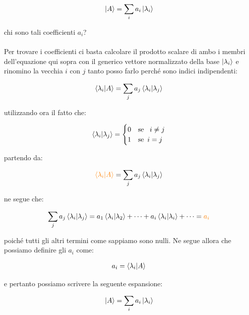 \begin{align*}
	\ket{A} = \sum_i a_i \ket{\lambda_i}
\end{align*}

	chi sono tali coefficienti $a_i$?
	\\
	\\
	Per trovare i coefficienti ci basta calcolare il prodotto scalare di ambo i membri dell'equazione qui sopra con il generico vettore normalizzato della base $\ket{\lambda_i}$ e rinomino la vecchia $i$ con $j$ tanto posso farlo perché sono indici indipendenti:

\begin{align*}
	\braket{\lambda_i}{A} = \sum_j a_j \braket{\lambda_i}{\lambda_j}
\end{align*}

	utilizzando ora il fatto che:
	
\begin{align*}
	\braket{\lambda_i}{\lambda_{j}} = \begin{cases}  
	0 & \text{se \, } i  \neq j\\
	1 & \text{se\, } i = j
\end{cases}
\end{align*}
	
	partendo da:

\begin{align*}
	\textcolor{orange}{\braket{\lambda_i}{A} }=  \sum_j a_j \braket{\lambda_i}{\lambda_j}
\end{align*}
	
	ne segue che:

\begin{align*}
	\sum_j a_j \braket{\lambda_i}{\lambda_j} = a_1 \braket{\lambda_i}{\lambda_2} + \dots  + a_i \braket{\lambda_i}{\lambda_i} + \dots = \textcolor{orange}{  a_i}
\end{align*}

	poiché tutti gli altri termini come sappiamo sono nulli. Ne segue allora che possiamo definire gli $a_i$ come:

\begin{mydef}
\begin{align*}
	a_i = \braket{\lambda_i}{A}
\end{align*}
\end{mydef}

	e pertanto possiamo scrivere la seguente espansione:
	
\begin{align*}
	\ket{A} = \sum_i a_i \ket{\lambda_i}
\end{align*}

